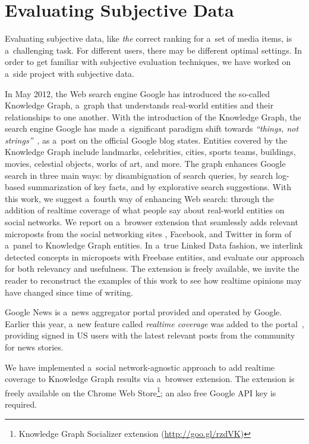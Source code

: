 \section{Evaluating Subjective Data}
Evaluating subjective data, like \emph{the} correct ranking
for a~set of media items, is a~challenging task.
For different users, there may be different optimal settings.
In order to get familiar with subjective evaluation techniques,
we have worked on a~side project with subjective data.

In May 2012, the Web search engine Google has introduced the so-called Knowledge Graph,
a~graph that understands real-world entities and their relationships to one another.
With the introduction of the Knowledge Graph, the search engine Google
has made a~significant paradigm shift towards \textit{``things, not strings''}~\cite{singhal2012},
as a~post on the official Google blog states.
Entities covered by the Knowledge Graph include landmarks, celebrities, cities, sports
teams, buildings, movies, celestial objects, works of art, and more.
The graph enhances Google search in three main ways:
by disambiguation of search queries,
by search log-based summarization of key facts,
and by explorative search suggestions.
With this work, we suggest a~fourth way of enhancing Web search:
through the addition of realtime coverage
of what people say about real-world entities on social networks.
We report on a~browser extension that seamlessly adds relevant microposts
from the social networking sites \googleplus, Facebook, and Twitter
in form of a~panel to Knowledge Graph entities.
In a~true Linked Data fashion, we interlink detected concepts in microposts
with Freebase entities, and evaluate our approach for both relevancy and usefulness.
The extension is freely available,
we invite the reader to reconstruct the examples of this work
to see how realtime opinions may have changed since time of writing.

Google News is a~news aggregator portal provided and operated by Google.
Earlier this year, a~new feature called \emph{realtime coverage}
was added to the portal~\cite{zuccarino2012}, providing signed in US \googleplus users
with the latest relevant posts from the \googleplus community for news stories.

We have implemented a~social network-agnostic approach
to add realtime coverage to Knowledge Graph results via a~browser extension.
The extension is freely available on the Chrome Web
Store\footnote{Knowledge Graph Socializer extension (\url{http://goo.gl/rzdVK})};
an also free Google API key is required.

